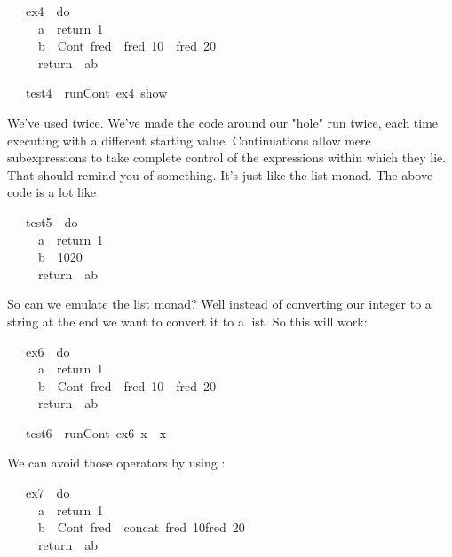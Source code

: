 \documentclass[12pt]{article}
\begin{document}
\begin{tabbing}\ttfamily
~~~ex4~~do\\
\ttfamily ~~~~~a~~return~1\\
\ttfamily ~~~~~b~~Cont~fred~~fred~10~~fred~20\\
\ttfamily ~~~~~return~~ab
\end{tabbing}
\begin{tabbing}\ttfamily
~~~test4~~runCont~ex4~show
\end{tabbing}
We've used  twice. We've made the code around our "hole" run twice, each time executing with a different starting value. Continuations allow mere subexpressions to take complete control of the expressions within which they lie. That should remind you of something. It's just like the list monad. The above code is a lot like
\begin{tabbing}\ttfamily
~~~test5~~do\\
\ttfamily ~~~~~a~~return~1\\
\ttfamily ~~~~~b~~1020\\
\ttfamily ~~~~~return~~ab
\end{tabbing}
So can we emulate the list monad? Well instead of converting our integer to a string at the end we want to convert it to a list. So this will work:
\begin{tabbing}\ttfamily
~~~ex6~~do\\
\ttfamily ~~~~~a~~return~1\\
\ttfamily ~~~~~b~~Cont~fred~~fred~10~~fred~20\\
\ttfamily ~~~~~return~~ab
\end{tabbing}
\begin{tabbing}\ttfamily
~~~test6~~runCont~ex6~x~~x
\end{tabbing}
We can avoid those  operators by using :
\begin{tabbing}\ttfamily
~~~ex7~~do\\
\ttfamily ~~~~~a~~return~1\\
\ttfamily ~~~~~b~~Cont~fred~~concat~fred~10fred~20\\
\ttfamily ~~~~~return~~ab
\end{tabbing}
\end{document}
